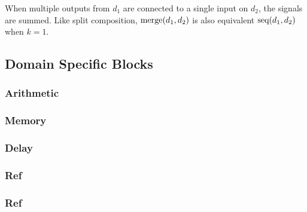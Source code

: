 When multiple outputs from $d_1$ are connected to a single input on $d_2$,
the signals are summed. Like split composition, $\Merge(d_1, d_2)$ is also equivalent
$\Sequential(d_1, d_2)$ when $k = 1$.

\begin{minipage}{0.5\linewidth}
  \begin{prooftree}
  \end{prooftree}
  \begin{prooftree}
  \end{prooftree}
\end{minipage}
\begin{minipage}{0.5\linewidth}
  \begin{figure}[H]
    \centering
    \label{fig:block_merge}
    
  \end{figure}
\end{minipage}

\subsection{Domain Specific Blocks}

\subsubsection{Arithmetic}
\subsubsection{Memory}
\subsubsection{Delay}
\subsubsection{Ref}
\subsubsection{Ref}

